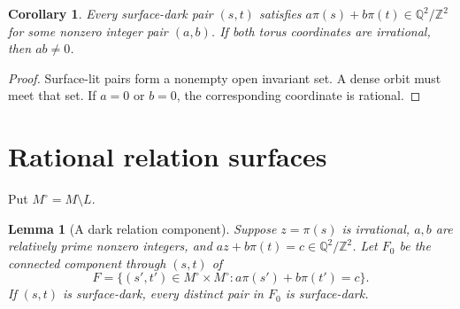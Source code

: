 \documentclass[11pt]{article}
\newtheorem{lemma}{Lemma}
\newtheorem{corollary}{Corollary}
\theoremstyle{remark}
\newcommand{\Q}{\mathbb Q}
\newcommand{\Z}{\mathbb Z}
\begin{document}
\begin{corollary}\label{cor:relation}
Every surface-dark pair $(s,t)$ satisfies
$a\pi(s)+b\pi(t)\in\Q^2/\Z^2$ for some nonzero integer pair $(a,b)$.
If both torus coordinates are irrational, then $ab\ne0$.
\end{corollary}
\begin{proof}
Surface-lit pairs form a nonempty open invariant set. A dense orbit must
meet that set. If $a=0$ or $b=0$, the corresponding coordinate is rational.
\end{proof}

\section{Rational relation surfaces}
Put $M^\circ=M\setminus L$.
\begin{lemma}[A dark relation component]\label{lem:relation}
Suppose $z=\pi(s)$ is irrational, $a,b$ are relatively prime nonzero
integers, and $az+b\pi(t)=c\in\Q^2/\Z^2$.
Let $F_0$ be the connected component through $(s,t)$ of
\[
 F=\{(s',t')\in M^\circ\times M^\circ:
                   a\pi(s')+b\pi(t')=c\}.
\]
If $(s,t)$ is surface-dark, every distinct pair in $F_0$ is surface-dark.
\end{lemma}
\end{document}
